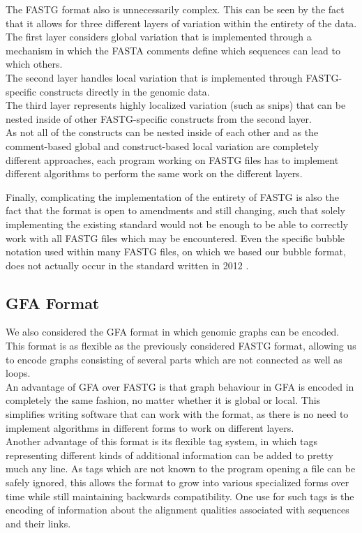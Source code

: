 \documentclass[a4paper,12pt,twoside,BCOR=10mm]{scrbook}
\begin{document}
The FASTG format also is unnecessarily complex. This can be seen by the fact that
it allows for three different layers of variation within the entirety of the data. \\
The first layer considers global variation that is implemented through a mechanism in which the
FASTA comments define which sequences can lead to which others. \\
The second layer handles local variation that is implemented through FASTG-specific constructs
directly in the genomic data. \\
The third layer represents highly localized variation (such as snips) that can be nested
inside of other FASTG-specific constructs from the second layer. \\
As not all of the constructs can be nested inside of each other
and as the comment-based global and construct-based local
variation are completely different approaches, each program working on FASTG files
has to implement different algorithms to perform the same work on the different layers.

Finally, complicating the implementation of the entirety of FASTG
is also the fact that the format is open to amendments and still changing,
such that solely implementing the existing standard would not be enough
to be able to correctly work with all FASTG files which may be encountered.
Even the specific bubble notation used within many FASTG files,
on which we based our bubble format,
does not actually occur in the standard written in 2012 \citep{specGFA1,specFASTG}.

\subsection{GFA Format}

We also considered the GFA format in which genomic graphs can be encoded.
This format is as flexible as the previously considered FASTG format, allowing us to encode graphs consisting of
several parts which are not connected as well as loops. \\
An advantage of GFA over FASTG is that
graph behaviour in GFA is encoded in completely the same fashion, no matter whether it is global
or local. This simplifies writing software that can work with the format,
as there is no need to implement algorithms in different forms to work on
different layers. \\
Another advantage of this format is its flexible tag system, in which tags representing different kinds of
additional information can be added to pretty much any line. As tags which are not known to the program
opening a file can be safely ignored, this allows the format to grow into various specialized forms over
time while still maintaining backwards compatibility.
One use for such tags is the encoding of information about the alignment qualities associated with sequences and their links.
\end{document}
